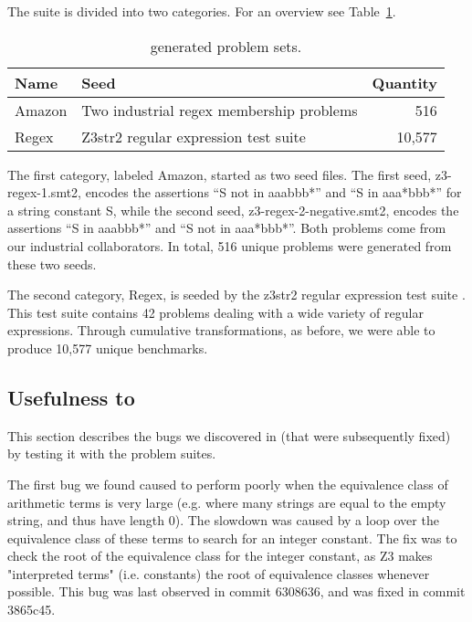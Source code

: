     The suite is divided into two categories. For an overview see Table~\ref{tbl:transformed}.
    
    \begin{table}
    \begin{tabular}{|l|l|r|}
        \hline
        \textbf{Name} & \textbf{Seed}                            & \textbf{Quantity} \\ \hline
        Amazon        & Two industrial regex membership problems & 516\\ \hline
        Regex         & Z3str2 regular expression test suite     & 10,577\\ \hline
    \end{tabular}
    \caption{\transformer{} generated problem sets.}
    \label{tbl:transformed}
    \end{table}

    The first category, labeled Amazon, started as two seed files.
    The first seed, z3-regex-1.smt2, encodes the assertions ``S not in aaabbb*'' and ``S in aaa*bbb*'' for a string constant S,
    while the second seed, z3-regex-2-negative.smt2, encodes the assertions ``S in aaabbb*'' and ``S not in aaa*bbb*''. 
    Both problems come from our industrial collaborators. 
    In total, 516 unique problems were generated from these two seeds.
    
    The second category, Regex, is seeded by the z3str2 regular expression test suite \cite{z3str2-tests}.
    This test suite contains 42 problems dealing with a wide variety of regular expressions.
    Through cumulative transformations, as before, we were able to produce 10,577 unique benchmarks.


    \subsection{Usefulness to \us{}}

        This section describes the bugs we discovered in \us{} (that were subsequently fixed) by testing it with the \fuzzer{} problem suites.

        The first bug we found caused \us{} to perform poorly when the equivalence class of arithmetic terms is very large (e.g. where many strings are equal to the empty string, and thus have length 0). The slowdown was caused by a loop over the equivalence class of these terms to search for an integer constant. The fix was to check the root of the equivalence class for the integer constant, as Z3 makes "interpreted terms" (i.e. constants) the root of equivalence classes whenever possible. This bug was last observed in commit 6308636, and was fixed in commit 3865c45.

